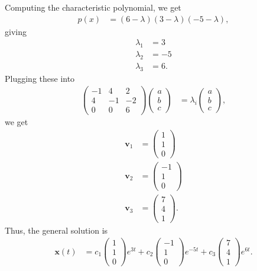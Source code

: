\documentclass[10pt]{mypackage}
\begin{document}
\begin{solution}[8.2, Problem 12]
  Computing the characteristic polynomial, we get
  \begin{align*}
    p(x) &= \left( 6-\lambda \right)\left( 3-\lambda \right)\left( -5-\lambda \right),
  \end{align*}
  giving
  \begin{align*}
    \lambda_1 &= 3\\
    \lambda_2 &= -5\\
    \lambda_3 &= 6.
  \end{align*}
  Plugging these into
  \begin{align*}
    \begin{pmatrix}-1 & 4 & 2 \\ 4 & -1 & -2 \\ 0 & 0 & 6\end{pmatrix} \begin{pmatrix}a\\b\\c\end{pmatrix} &= \lambda_i \begin{pmatrix}a\\b\\c\end{pmatrix},
  \end{align*}
  we get
  \begin{align*}
    \mathbf{v}_1 &= \begin{pmatrix}1\\1\\0\end{pmatrix}\\
    \mathbf{v}_2 &= \begin{pmatrix}-1\\1\\0\end{pmatrix}\\
    \mathbf{v}_3 &= \begin{pmatrix}7\\4\\1\end{pmatrix}.
  \end{align*}
  Thus, the general solution is
  \begin{align*}
    \mathbf{x}(t) &= c_1\begin{pmatrix}1\\1\\0\end{pmatrix} e^{3t} + c_2 \begin{pmatrix}-1\\1\\0\end{pmatrix}e^{-5t} + c_3 \begin{pmatrix}7\\4\\1\end{pmatrix} e^{6t}.
  \end{align*}
\end{solution}
\end{document}
